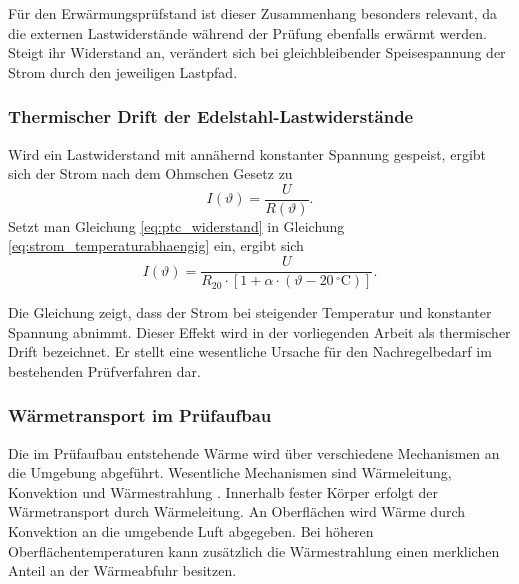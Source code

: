 Für den Erwärmungsprüfstand ist dieser Zusammenhang besonders relevant, da die externen Lastwiderstände während der Prüfung ebenfalls erwärmt werden. Steigt ihr Widerstand an, verändert sich bei gleichbleibender Speisespannung der Strom durch den jeweiligen Lastpfad.

\subsubsection{Thermischer Drift der Edelstahl-Lastwiderstände}
\label{sec:thermischer_drift}

Wird ein Lastwiderstand mit annähernd konstanter Spannung gespeist, ergibt sich der Strom nach dem Ohmschen Gesetz zu
\begin{equation}
    I(\vartheta) = \frac{U}{R(\vartheta)} .
    \label{eq:strom_temperaturabhaengig}
\end{equation}
Setzt man Gleichung \ref{eq:ptc_widerstand} in Gleichung \ref{eq:strom_temperaturabhaengig} ein, ergibt sich
\begin{equation}
    I(\vartheta) =
    \frac{U}
    {R_{20} \cdot \left[ 1 + \alpha \cdot (\vartheta - 20\,^\circ\mathrm{C}) \right]} .
    \label{eq:thermischer_drift}
\end{equation}

Die Gleichung zeigt, dass der Strom bei steigender Temperatur und konstanter Spannung abnimmt. Dieser Effekt wird in der vorliegenden Arbeit als thermischer Drift bezeichnet. Er stellt eine wesentliche Ursache für den Nachregelbedarf im bestehenden Prüfverfahren dar.

\subsubsection{Wärmetransport im Prüfaufbau}
\label{sec:waermetransport}

Die im Prüfaufbau entstehende Wärme wird über verschiedene Mechanismen an die Umgebung abgeführt. Wesentliche Mechanismen sind Wärmeleitung, Konvektion und Wärmestrahlung \cite{Griesinger_Waermemanagement}. Innerhalb fester Körper erfolgt der Wärmetransport durch Wärmeleitung. An Oberflächen wird Wärme durch Konvektion an die umgebende Luft abgegeben. Bei höheren Oberflächentemperaturen kann zusätzlich die Wärmestrahlung einen merklichen Anteil an der Wärmeabfuhr besitzen.

